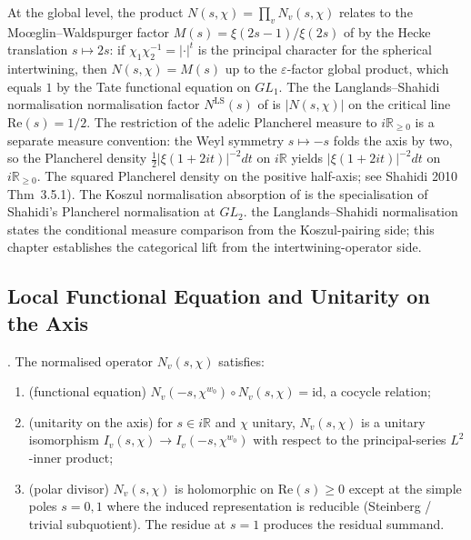 \begin{remark}
\label{v4-arith:w6-d:rem:W6C-relation}
At the global level, the product
\(N(s,\chi)=\prod_{v}N_{v}(s,\chi)\) relates to the
Mo{\oe}glin--Waldspurger factor \(M(s)=\xi(2s-1)/\xi(2s)\) of
 by the Hecke translation
\(s\mapsto 2s\): if \(\chi_{1}\chi_{2}^{-1}=|\cdot|^{t}\) is the
principal character for the spherical intertwining, then
\(N(s,\chi)=M(s)\) up to the \(\varepsilon\)-factor global product,
which equals \(1\) by the Tate functional equation on \(GL_{1}\). The
the Langlands--Shahidi normalisation normalisation factor
\(N^{\mathrm{LS}}(s)\) of  is
\(|N(s,\chi)|\) on the critical line \(\mathrm{Re}(s)=1/2\). The
restriction of the adelic Plancherel measure to \(i\mathbb{R}_{\geq 0}\)
is a separate measure convention: the Weyl symmetry
\(s\mapsto -s\) folds the axis by two, so the Plancherel density
\(\frac{1}{2}|\xi(1+2it)|^{-2}dt\) on \(i\mathbb{R}\) yields
\(|\xi(1+2it)|^{-2}dt\) on \(i\mathbb{R}_{\geq 0}\). The squared
Plancherel density on the positive half-axis; see Shahidi 2010
Thm~3.5.1). The Koszul normalisation absorption of
 is the specialisation of
Shahidi's Plancherel normalisation at \(GL_{2}\). the Langlands--Shahidi normalisation states the
conditional measure comparison from the Koszul-pairing side; this chapter establishes
the categorical lift from the intertwining-operator side.
\end{remark}

\subsection{Local Functional Equation and Unitarity on the Axis}

\begin{proposition}
\label{v4-arith:w6-d:prop:local-FE}
\ClaimStatusProvedElsewhere. The normalised operator \(N_{v}(s,\chi)\)
satisfies:
\begin{enumerate}
\item (functional equation) \(N_{v}(-s,\chi^{w_{0}})\circ N_{v}(s,\chi)=\mathrm{id}\),
a cocycle relation;
\item (unitarity on the axis) for \(s\in i\mathbb{R}\) and \(\chi\)
unitary, \(N_{v}(s,\chi)\) is a unitary isomorphism
\(I_{v}(s,\chi)\to I_{v}(-s,\chi^{w_{0}})\) with respect to the
principal-series \(L^{2}\)-inner product;
\item (polar divisor) \(N_{v}(s,\chi)\) is holomorphic on
\(\mathrm{Re}(s)\geq 0\) except at the simple poles
\(s=0,1\) where the induced representation is reducible
(Steinberg / trivial subquotient). The residue at \(s=1\) produces
the residual summand.
\end{enumerate}
\end{proposition}

